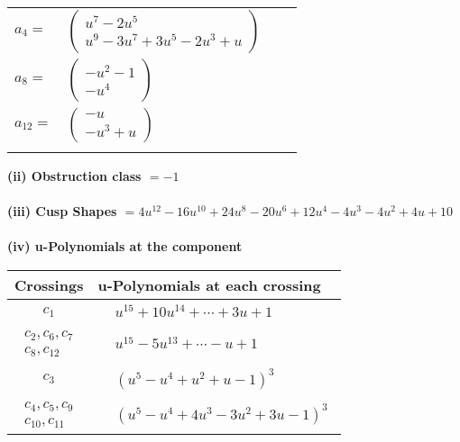 \documentclass[1p]{elsarticle_modified}
\theoremstyle{definition}
\begin{document}
\begin{tabular}{m{7pt} m{180pt} m{7pt} m{180pt} }
\flushright $a_{4}=$&$\begin{pmatrix}u^7-2 u^5\\u^9-3 u^7+3 u^5-2 u^3+u\end{pmatrix}$ \\
\flushright $a_{8}=$&$\begin{pmatrix}- u^2-1\\- u^4\end{pmatrix}$ \\
\flushright $a_{12}=$&$\begin{pmatrix}- u\\- u^3+u\end{pmatrix}$\\&\end{tabular}
\flushleft \textbf{(ii) Obstruction class $= -1$}\\~\\
\flushleft \textbf{(iii) Cusp Shapes $= 4 u^{12}-16 u^{10}+24 u^8-20 u^6+12 u^4-4 u^3-4 u^2+4 u+10$}\\~\\
\newpage\renewcommand{\arraystretch}{1}
\flushleft \textbf{(iv) u-Polynomials at the component}\newline \\
\begin{tabular}{m{50pt}|m{274pt}}
Crossings & \hspace{64pt}u-Polynomials at each crossing \\
\hline $$\begin{aligned}c_{1}\end{aligned}$$&$\begin{aligned}
&u^{15}+10 u^{14}+\cdots+3 u+1
\end{aligned}$\\
\hline $$\begin{aligned}c_{2},c_{6},c_{7}\\c_{8},c_{12}\end{aligned}$$&$\begin{aligned}
&u^{15}-5 u^{13}+\cdots- u+1
\end{aligned}$\\
\hline $$\begin{aligned}c_{3}\end{aligned}$$&$\begin{aligned}
&(u^5- u^4+u^2+u-1)^3
\end{aligned}$\\
\hline $$\begin{aligned}c_{4},c_{5},c_{9}\\c_{10},c_{11}\end{aligned}$$&$\begin{aligned}
&(u^5- u^4+4 u^3-3 u^2+3 u-1)^3
\end{aligned}$\\
\hline
\end{tabular}\\~\\
\end{document}
